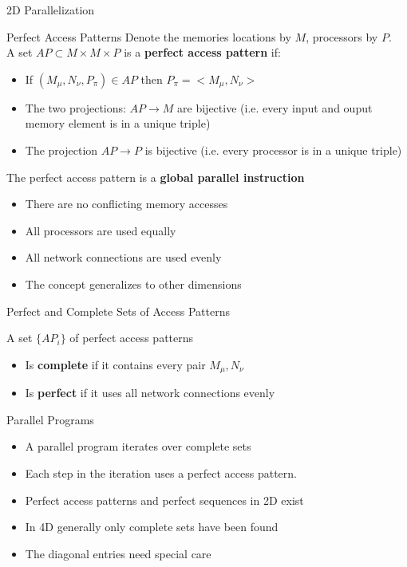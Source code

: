 \documentclass{beamer}
\begin{document}
\begin{frame}{2D Parallelization}
\begin{block}{Perfect Access Patterns}
Denote the memories locations by $M$, processors by $P$. \\
A set $AP \subset M \times M \times P$ is a  {\bf perfect access pattern} if:
  \begin{itemize}
  \item If $(M_\mu, N_\nu, P_\pi) \in AP$ then $P_\pi = <M_\mu, N_\nu>$ 
  \item The two projections: $AP \rightarrow M$ are bijective (i.e. every input and ouput memory element is in a unique triple)
  \item The projection $AP \rightarrow P$ is bijective (i.e. every processor is in a unique triple)
  \end{itemize}
\end{block}
  
\begin{block}{The perfect access pattern is a {\bf global parallel instruction}}
  \begin{itemize} 
  \item There are no conflicting memory accesses
  \item All processors are used equally
  \item All network connections are used evenly
  \item The concept generalizes to other dimensions
  \end{itemize}
\end{block}
\end{frame}

\begin{frame}{Perfect and Complete Sets of Access Patterns}
\begin{block}{A set $\{ AP_i\}$ of perfect access patterns}
\begin{itemize}
\item Is {\bf complete} if it contains every pair $M_\mu, N_\nu$
\item Is {\bf perfect} if it uses all network connections evenly
\end{itemize}
\end{block}

\begin{block}{Parallel Programs}
\begin{itemize}
\item A parallel program iterates over complete sets
\item Each step in the iteration uses a perfect access pattern.
\item Perfect access patterns and perfect sequences in 2D exist
\item In 4D generally only complete sets have been found
\item The diagonal entries need special care
\end{itemize}
\end{block}
\end{frame}
\end{document}
